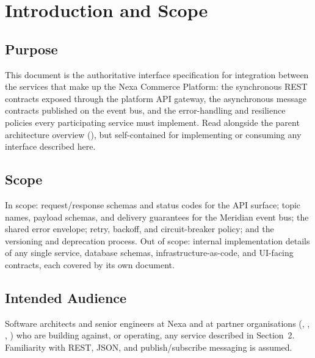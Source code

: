 \section{Introduction and Scope}

\subsection{Purpose}
This document is the authoritative interface specification for integration between the
services that make up the Nexa Commerce Platform: the synchronous REST contracts exposed
through the platform API gateway, the asynchronous message contracts published on the
 event bus, and the error-handling and resilience policies every participating
service must implement. Read alongside the parent architecture overview
(), but self-contained for implementing or consuming any interface
described here.

\subsection{Scope}
In scope: request/response schemas and status codes for the  API surface; topic
names, payload schemas, and delivery guarantees for the Meridian event bus; the shared error
envelope; retry, backoff, and circuit-breaker policy; and the versioning and deprecation
process. Out of scope: internal implementation details of any single service, database
schemas, infrastructure-as-code, and UI-facing contracts, each covered by its own document.

\subsection{Intended Audience}
Software architects and senior engineers at Nexa and at partner organisations (,
, , ) who are building against, or operating, any service
described in Section~2. Familiarity with REST, JSON, and publish/subscribe messaging is
assumed.

